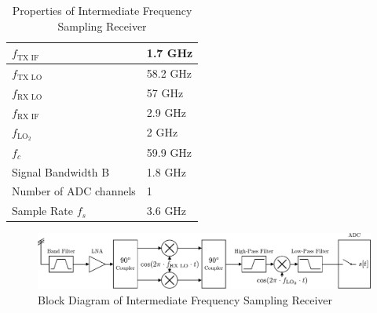 \begin{table}[h]
  \centering
  \begin{tabular}{|l|l|}
    \hline
    $f_{\text{TX IF}}$ & 1.7 GHz \\ \hline
    $f_{\text{TX LO}}$ & 58.2 GHz \\ \hline
    $f_{\text{RX LO}}$ & 57 GHz \\ \hline
    $f_{\text{RX IF}}$ & 2.9 GHz \\ \hline
    $f_{\text{LO}_2} $ & 2 GHz \\ \hline
    $f_c$           & 59.9 GHz \\ \hline
    Signal Bandwidth B & 1.8 GHz \\ \hline
    Number of \gls{ADC} channels & 1 \\ \hline
    Sample Rate $f_s$ & 3.6 GHz \\ \hline
  \end{tabular}
  \caption{Properties of Intermediate Frequency Sampling Receiver}
  \label{tab:rx_1}
\end{table}

\begin{figure}[h!]
  \centering
  \includegraphics[width=\textwidth]{figures/rx_1_bd}
  \caption{Block Diagram of Intermediate Frequency Sampling Receiver}
  \label{fig:rx_1_bd}
\end{figure}

